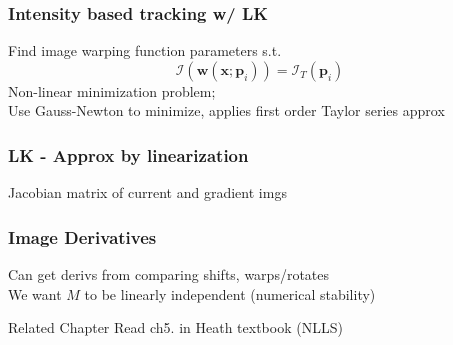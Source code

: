 \documentclass{article}
\begin{document}
\subsubsection{Intensity based tracking w/ LK}
Find image warping function parameters s.t.
\[
    \mathcal I (\mathbf w (\mathbf x; \mathbf p_i)) = \mathcal I_T(\mathbf p_i)
\]
\noindent
Non-linear minimization problem; \\
Use Gauss-Newton to minimize, applies first order Taylor series approx

\subsubsection*{LK - Approx by linearization}
Jacobian matrix of current and gradient imgs

\subsubsection{Image Derivatives}
Can get derivs from comparing shifts, warps/rotates
\\
We want $M$ to be linearly independent (numerical stability)

\begin{refer}
{Related Chapter}{}
Read ch5. in Heath textbook (NLLS) 

\end{refer}
\end{document}
